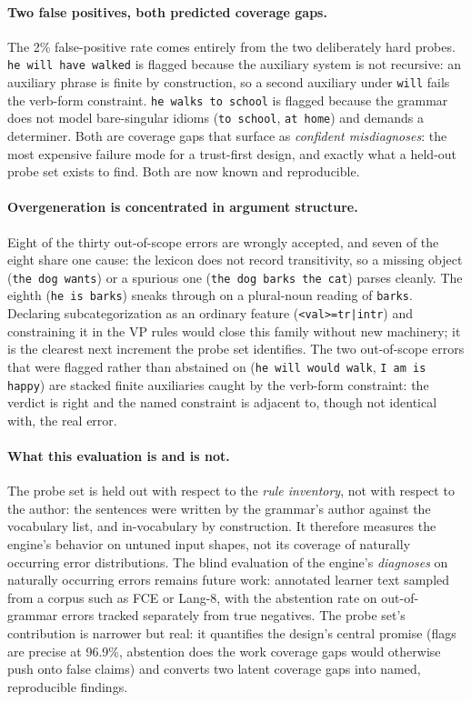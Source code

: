 \documentclass[11pt]{article}
\theoremstyle{definition}
\theoremstyle{plain}
\theoremstyle{remark}
\begin{document}
\paragraph{Two false positives, both predicted coverage gaps.}
The 2\% false-positive rate comes entirely from the two deliberately hard probes.
\texttt{he will have walked} is flagged because the auxiliary system is not recursive: an
auxiliary phrase is finite by construction, so a second auxiliary under \texttt{will}
fails the verb-form constraint. \texttt{he walks to school} is flagged because the
grammar does not model bare-singular idioms (\texttt{to school}, \texttt{at home}) and
demands a determiner. Both are coverage gaps that surface as \emph{confident
misdiagnoses}: the most expensive failure mode for a trust-first design, and exactly
what a held-out probe set exists to find. Both are now known and reproducible.

\paragraph{Overgeneration is concentrated in argument structure.}
Eight of the thirty out-of-scope errors are wrongly accepted, and seven of the eight
share one cause: the lexicon does not record transitivity, so a missing object
(\texttt{the dog wants}) or a spurious one (\texttt{the dog barks the cat}) parses
cleanly. The eighth (\texttt{he is barks}) sneaks through on a plural-noun reading of
\texttt{barks}. Declaring subcategorization as an ordinary feature
(\texttt{<val>=tr|intr}) and constraining it in the VP rules would close this family
without new machinery; it is the clearest next increment the probe set identifies.
The two out-of-scope errors that were flagged rather than abstained on
(\texttt{he will would walk}, \texttt{I am is happy}) are stacked finite auxiliaries
caught by the verb-form constraint: the verdict is right and the named constraint is
adjacent to, though not identical with, the real error.

\paragraph{What this evaluation is and is not.}
The probe set is held out with respect to the \emph{rule inventory}, not with respect to
the author: the sentences were written by the grammar's author against the vocabulary
list, and in-vocabulary by construction. It therefore measures the engine's behavior on
untuned input shapes, not its coverage of naturally occurring error distributions. The
blind evaluation of the engine's \emph{diagnoses} on naturally occurring errors remains future work: annotated learner text sampled from a
corpus such as FCE or Lang-8, with the abstention rate on out-of-grammar errors tracked
separately from true negatives. The probe set's contribution is narrower but real: it
quantifies the design's central promise (flags are precise at 96.9\%, abstention does the
work coverage gaps would otherwise push onto false claims) and converts two latent
coverage gaps into named, reproducible findings.
\end{document}
